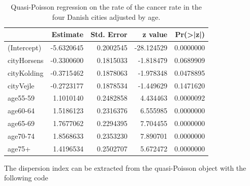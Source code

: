 \documentclass[
]{book}
\newenvironment{Shaded}{\begin{snugshade}}{\end{snugshade}}
\newcommand{\AttributeTok}[1]{\textcolor[rgb]{0.13,0.29,0.53}{#1}}
\newcommand{\CommentTok}[1]{\textcolor[rgb]{0.56,0.35,0.01}{\textit{#1}}}
\newcommand{\DecValTok}[1]{\textcolor[rgb]{0.00,0.00,0.81}{#1}}
\newcommand{\FunctionTok}[1]{\textcolor[rgb]{0.13,0.29,0.53}{\textbf{#1}}}
\newcommand{\NormalTok}[1]{#1}
\newcommand{\OtherTok}[1]{\textcolor[rgb]{0.56,0.35,0.01}{#1}}
\newcommand{\SpecialCharTok}[1]{\textcolor[rgb]{0.81,0.36,0.00}{\textbf{#1}}}
\begin{document}
\begin{table}

\caption{\label{tab:unnamed-chunk-160}Quasi-Poisson regression on the rate of the cancer rate in the four Danish cities adjusted by age.}
\centering
\begin{tabular}[t]{l|r|r|r|r}
\hline
  & Estimate & Std. Error & z value & Pr(>|z|)\\
\hline
(Intercept) & -5.6320645 & 0.2002545 & -28.124529 & 0.0000000\\
\hline
cityHorsens & -0.3300600 & 0.1815033 & -1.818479 & 0.0689909\\
\hline
cityKolding & -0.3715462 & 0.1878063 & -1.978348 & 0.0478895\\
\hline
cityVejle & -0.2723177 & 0.1878534 & -1.449629 & 0.1471620\\
\hline
age55-59 & 1.1010140 & 0.2482858 & 4.434463 & 0.0000092\\
\hline
age60-64 & 1.5186123 & 0.2316376 & 6.555985 & 0.0000000\\
\hline
age65-69 & 1.7677062 & 0.2294395 & 7.704455 & 0.0000000\\
\hline
age70-74 & 1.8568633 & 0.2353230 & 7.890701 & 0.0000000\\
\hline
age75+ & 1.4196534 & 0.2502707 & 5.672472 & 0.0000000\\
\hline
\end{tabular}
\end{table}

The dispersion index can be extracted from the quasi-Poisson object with the following code

\begin{Shaded}
\end{Shaded}
\end{document}
